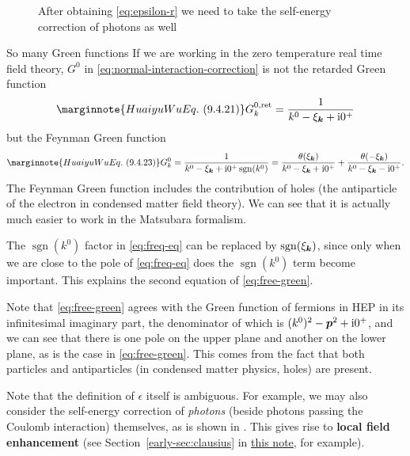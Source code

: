 \documentclass[hyperref, a4paper]{article}
\DeclareMathOperator{\sgn}{sgn}
\newcommand*{\ii}{\mathrm{i}}
\newcommand*{\concept}[1]{{\textbf{#1}}}
\newcommand{\earlydoc}{\href{../advanced-electrodynamics/early-lectures-1.pdf}{this note}}
\begin{document}
\begin{figure}
    \centering
    
    \caption{After obtaining \eqref{eq:epsilon-r} we need to take the self-energy correction of photons as well}
    \label{fig:another-self-energy}
\end{figure}

\begin{note*}{So many Green functions}
    If we are working in the zero temperature real time field theory, $G^0$ in 
    \eqref{eq:normal-interaction-correction} is not the retarded Green function 
    \begin{equation} \marginnote{Huaiyu Wu Eq.~(9.4.21)}
        G^{0, \text{ret}}_k = \frac{1}{k^0 - \xi_{\vb*{k}} + \ii 0^+} 
    \end{equation}  
    but the Feynman Green function 
    \begin{equation} \marginnote{Huaiyu Wu Eq.~(9.4.23)}
        G^{0}_k = \frac{1}{k^0 - \xi_{\vb*{k}} + \ii 0^+ \sgn(k^0)} = \frac{\theta(\xi_{\vb*{k}})}{k^0 - \xi_{\vb*{k}} + \ii 0^+} + \frac{\theta(- \xi_{\vb*{k}})}{k^0 - \xi_{\vb*{k}} - \ii 0^+}.
        \label{eq:free-green}
    \end{equation}
    The Feynman Green function includes the contribution of holes (the antiparticle of the electron in condensed
    matter field theory). We can see that it is actually much easier to work in the Matsubara formalism.

    The $\sgn(k^0)$ factor in \eqref{eq:freq-eq} can be replaced by $\sgn(\xi_{\vb*{k}})$, since only when we 
    are close to the pole of \eqref{eq:freq-eq} does the $\sgn(k^0)$ term become important. This explains 
    the second equation of \eqref{eq:free-green}.

    Note that \eqref{eq:free-green} agrees with the Green function of fermions in HEP in its infinitesimal 
    imaginary part, the denominator of which is $(k^0)^2 - \vb*{p}^2 + \ii 0^+$, and we can see that there 
    is one pole on the upper plane and another on the lower plane, as is the case in \eqref{eq:free-green}.
    This comes from the fact that both particles and antiparticles (in condensed matter physics, holes) 
    are present.  
\end{note*}

Note that the definition of $\epsilon$ itself is ambiguous. For example, we may also consider the 
self-energy correction of \emph{photons} (beside photons passing the Coulomb interaction) themselves, as is shown in .
This gives rise to \concept{local field enhancement} (see Section~\ref{early-sec:clausius} in \earlydoc, 
for example). 
\end{document}
